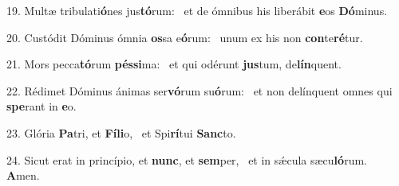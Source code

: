 19. Multæ tribulati\textbf{ó}nes jus\textbf{tó}rum: \ast\  et de ómnibus his liberábit \textbf{e}os \textbf{Dó}minus.\

20. Custódit Dóminus ómnia \textbf{os}sa e\textbf{ó}rum: \ast\  unum ex his non \textbf{con}te\textbf{ré}tur.\

21. Mors pecca\textbf{tó}rum \textbf{pés}\textbf{si}ma: \ast\  et qui odérunt \textbf{jus}tum, de\textbf{lín}quent.\

22. Rédimet Dóminus ánimas ser\textbf{vó}rum su\textbf{ó}rum: \ast\  et non delínquent omnes qui \textbf{spe}rant in \textbf{e}o.\

23. Glória \textbf{Pa}tri, et \textbf{Fí}\textbf{li}o, \ast\  et Spi\textbf{rí}tui \textbf{Sanc}to.\

24. Sicut erat in princípio, et \textbf{nunc}, et \textbf{sem}per, \ast\  et in sǽcula sæcu\textbf{ló}rum. \textbf{A}men.\

